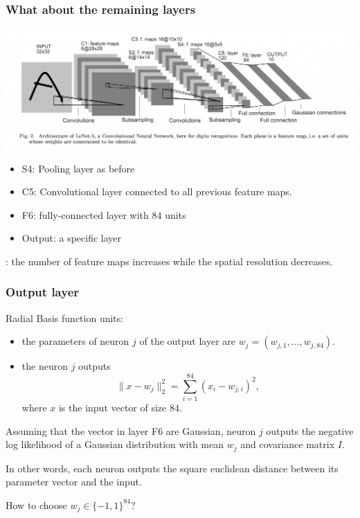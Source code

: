 \begin{frame}
	\frametitle{What about the remaining layers}

	\begin{center}
		\includegraphics[scale=0.3]{figs/LeNet}
	\end{center}

\pause
\begin{itemize}
	\item S4: Pooling layer as before
	\item C5: Convolutional layer connected to all previous feature maps.
	\item F6: fully-connected layer with $84$ units
	\item Output: a specific layer
\end{itemize}

: the number of feature maps increases while the spatial resolution decreases.

\end{frame}

\begin{frame}
	\frametitle{Output layer}



	Radial Basis function units:
	\begin{itemize}
		\item the parameters of neuron $j$ of the output layer are $w_j = (w_{j,1}, \hdots , w_{j, 84})$.

		\item the neuron $j$ outputs
		$$
		\|x - w_j\|_2^2 = \sum_{i=1}^{84} (x_i - w_{j,i})^2,
		$$
		where $x$ is the input vector of size $84$.
	\end{itemize}

	\bigskip

	Assuming that the vector in layer F6 are Gaussian, neuron $j$ outputs the negative log likelihood of a Gaussian distribution with mean $w_j$ and covariance matrix $I$.

	\bigskip

	In other words, each neuron outputs the square euclidean distance between its parameter vector and the input.

	\medskip

	How to choose $w_j \in \{-1, 1\}^{84}$?

\end{frame}

